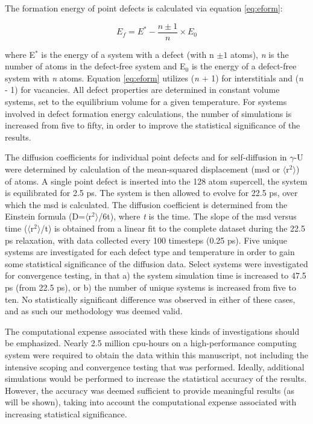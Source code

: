 \documentclass[review]{elsarticle}
\begin{document}
The formation energy of point defects is calculated via equation \ref{eq:eform}: 

\begin{equation}
\label{eq:eform}
E_f = E^* - \frac{n \pm 1}{n} \times E_0
\end{equation}

where E$^{*}$ is the energy of a system with a defect (with n $\pm 1$ atoms), \textit{n} is the number of atoms in the defect-free system and E$_{0}$ is the energy of a defect-free system with \textit{n} atoms. Equation \ref{eq:eform} utilizes (\textit{n} + 1) for interstitials and (\textit{n} - 1) for vacancies. All defect properties are determined in constant volume systems, set to the equilibrium volume for a given temperature. For systems involved in defect formation energy calculations, the number of simulations is increased from five to fifty, in order to improve the statistical significance of the results.

The diffusion coefficients for individual point defects and for self-diffusion in $\gamma$-U were determined by calculation of the mean-squared displacement (msd or $\langle$r$^2$$\rangle$) of atoms. A single point defect is inserted into the 128 atom supercell, the system is equilibrated for 2.5 ps. The system is then allowed to evolve for 22.5 ps, over which the msd is calculated. The diffusion coefficient is determined from the Einstein formula (D=$\langle$r$^2$$\rangle$/6t), where \textit{t} is the time. The slope of the msd versus time ($\langle$r$^2$$\rangle$/t) is obtained from a linear fit to the complete dataset during the 22.5 ps relaxation, with data collected every 100 timesteps (0.25 ps). Five unique systems are investigated for each defect type and temperature in order to gain some statistical significance of the diffusion data. Select systems were investigated for convergence testing, in that a) the system simulation time is increased to 47.5 ps (from 22.5 ps), or b) the number of unique systems is increased from five to ten. No statistically significant difference was observed in either of these cases, and as such our methodology was deemed valid. 

The computational expense associated with these kinds of investigations should be emphasized. Nearly 2.5 million cpu-hours on a high-performance computing system were required to obtain the data within this manuscript, not including the intensive scoping and convergence testing that was performed. Ideally, additional simulations would be performed to increase the statistical accuracy of the results. However, the accuracy was deemed sufficient to provide meaningful results (as will be shown), taking into account the computational expense associated with increasing statistical significance. 
\end{document}
